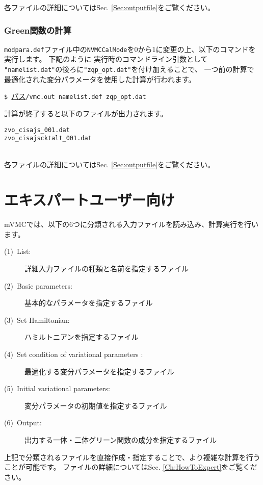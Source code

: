 各ファイルの詳細についてはSec. \ref{Sec:outputfile}をご覧ください。


\subsubsection{Green関数の計算}
\verb|modpara.def|ファイル中の\verb|NVMCCalMode|を0から1に変更の上、以下のコマンドを実行します。
下記のように
実行時のコマンドライン引数として
\verb|"namelist.dat"|の後ろに\verb|"zqp_opt.dat"|を付け加えることで、
一つ前の計算で最適化された変分パラメータを使用した計算が行われます。

\vspace{1cm}\hspace{-0.7cm}
\verb|$ |\underline{パス}\verb|/vmc.out namelist.def zqp_opt.dat|
\small

計算が終了すると以下のファイルが出力されます。
\\
\begin{minipage}{12cm}
\begin{screen}
\begin{verbatim}
zvo_cisajs_001.dat
zvo_cisajscktalt_001.dat
\end{verbatim}
\end{screen}
\end{minipage}
\\
各ファイルの詳細についてはSec. \ref{Sec:outputfile}をご覧ください。

\section{エキスパートユーザー向け}
mVMCでは、以下の6つに分類される入力ファイルを読み込み、計算実行を行います。
\begin{description}
\item[(1)~List:]詳細入力ファイルの種類と名前を指定するファイル
\item[(2)~Basic parameters:]基本的なパラメータを指定するファイル
\item[(3)~Set Hamiltonian:]ハミルトニアンを指定するファイル 
\item[(4)~Set condition of variational parameters :] 最適化する変分パラメータを指定するファイル
\item[(5)~Initial variational parameters:]変分パラメータの初期値を指定するファイル
\item[(6)~Output:]出力する一体・二体グリーン関数の成分を指定するファイル
\end{description}

上記で分類されるファイルを直接作成・指定することで、より複雑な計算を行うことが可能です。
ファイルの詳細についてはSec. \ref{Ch:HowToExpert}をご覧ください。

